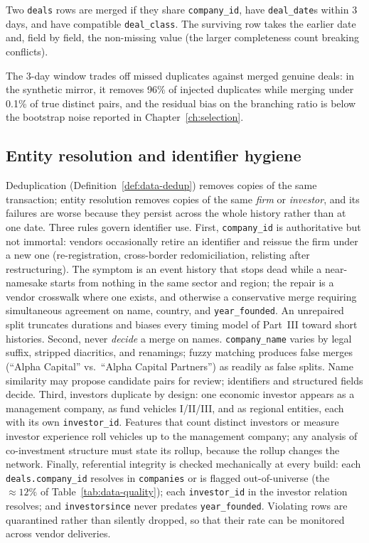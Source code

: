\begin{definition}
\label{def:data-dedup}
Two \texttt{deals} rows are merged if they share \texttt{company\_id}, have
\texttt{deal\_date}s within 3 days, and have compatible \texttt{deal\_class}. The
surviving row takes the earlier date and, field by field, the non-missing value (the
larger completeness count breaking conflicts).
\end{definition}

The 3-day window trades off missed duplicates against merged genuine deals: in the
synthetic mirror, it removes 96\% of injected duplicates while merging under 0.1\% of
true distinct pairs, and the residual bias on the branching ratio is below the bootstrap
noise reported in Chapter~\ref{ch:selection}.

\subsection{Entity resolution and identifier hygiene}
\label{sec:data-entity}

Deduplication (Definition~\ref{def:data-dedup}) removes copies of the same transaction;
entity resolution removes copies of the same \emph{firm} or \emph{investor}, and its
failures are worse because they persist across the whole history rather than at one
date. Three rules govern identifier use. First, \texttt{company\_id} is authoritative
but not immortal: vendors occasionally retire an identifier and reissue the firm under
a new one (re-registration, cross-border redomiciliation, relisting after
restructuring). The symptom is an event history that stops dead while a near-namesake
starts from nothing in the same sector and region; the repair is a vendor crosswalk
where one exists, and otherwise a conservative merge requiring simultaneous agreement
on name, country, and \texttt{year\_founded}. An unrepaired split truncates durations
and biases every timing model of Part~III toward short histories. Second, never
\emph{decide} a merge on names. \texttt{company\_name} varies by legal suffix,
stripped diacritics, and renamings; fuzzy matching produces false merges (``Alpha
Capital'' vs.\ ``Alpha Capital Partners'') as readily as false splits. Name similarity
may propose candidate pairs for review; identifiers and structured fields decide.
Third, investors duplicate by design: one economic investor appears as a management
company, as fund vehicles I/II/III, and as regional entities, each with its own
\texttt{investor\_id}. Features that count distinct investors or measure investor
experience roll vehicles up to the management company; any analysis of co-investment
structure must state its rollup, because the rollup changes the network. Finally,
referential integrity is checked mechanically at every build: each
\texttt{deals.company\_id} resolves in \texttt{companies} or is flagged
out-of-universe (the $\approx 12\%$ of Table~\ref{tab:data-quality}); each
\texttt{investor\_id} in the investor relation resolves; and \texttt{investorsince}
never predates \texttt{year\_founded}. Violating rows are quarantined rather than
silently dropped, so that their rate can be monitored across vendor deliveries.


